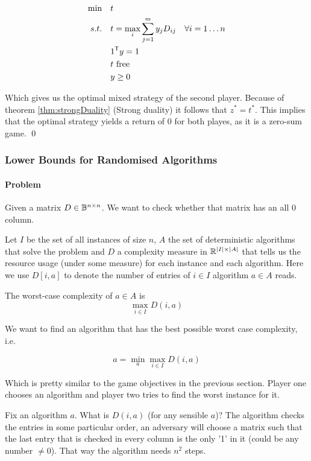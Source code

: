 \begin{pr}
\begin{align*}
\min \quad & t \\
s.t.\quad & t = \max_i \sum^m_{j=1} y_j D_{ij} & \forall i=1\ldots n\\
& {1}^\text{\upshape \sffamily T} y = 1\\
&t \text{ free}\\
&y\geq 0
\end{align*}

Which gives us the optimal mixed strategy of the second player. Because of theorem \ref{thm:strongDuality} (Strong duality) it follows that $z^{*}=t^{*}$. This implies that the optimal strategy yields a return of $0$ for both playes, as it is a zero-sum game.
\qed \end{pr}

\subsubsection{Lower Bounds for Randomised Algorithms}

\paragraph{Problem} Given a matrix $D\in \mathbb{B}^{n\times n}$. We want to check whether that matrix has an all 0 column. 

Let $I$ be the set of all instances of size $n$, $A$ the set of deterministic algorithms that solve the problem and $D$ a complexity measure in $\mathbb{R}^{|I| \times |A|}$ that tells us the resource usage (under some measure) for each instance and each algorithm. Here we use $D[i,a]$ to denote the number of entries of $i\in I$ algorithm $a\in A$ reads.

\begin{Def} The worst-case complexity of $a\in A$ is 
\[\max_{i\in I} D(i,a)\]
\end{Def}

We want to find an algorithm that has the best possible worst case complexity, i.e.

\[a = \min_a \max_{i\in I} D(i,a)\]

Which is pretty similar to the game objectives in the previous section. Player one chooses an algorithm and player two tries to find the worst instance for it.

Fix an algorithm $a$. What is $D(i,a)$ (for any sensible $a$)? The algorithm checks the entries in some particular order, an adversary will choose a matrix such that the last entry that is checked in every column is the only '1' in it (could be any number $\neq 0$). That way the algorithm needs $n^2$ steps.

